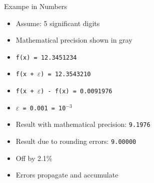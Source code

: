 \begin{frame}{Exampe in Numbers}
%
\begin{itemize}
\item Assume: 5 significant digits
\item Mathematical precision shown in gray
\item \texttt{f(x) = 12.345{\color{gray}1234}}
\item \texttt{f(x + $\varepsilon$) = 12.354{\color{gray}3210}}
\item \texttt{f(x + $\varepsilon$) - f(x) = 0.009{\color{gray}1976}}
\item \texttt{$\varepsilon$ = 0.001 = 10}$^{-3}$
\item Result with mathematical precision: \texttt{9.1976}
\item Result due to rounding errors: \texttt{9.00000}
\item[\Thus] Off by 2.1\%
\item[\Thus] Errors propagate and accumulate
\end{itemize}
%
\end{frame}


